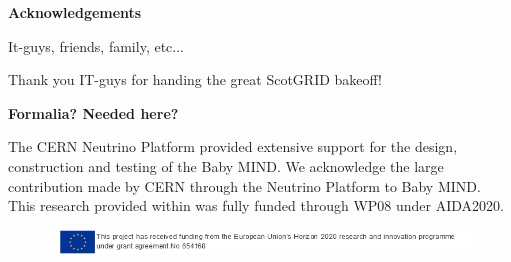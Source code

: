 \vspace*{1.75in}

\begin{center} {\bf Acknowledgements}\end{center}

It-guys, friends, family, etc...

Thank you IT-guys for handing the great ScotGRID bakeoff!

\textbf{Formalia? Needed here?}

The CERN Neutrino Platform provided extensive support for the design, construction and testing of the Baby MIND. We acknowledge the large contribution made by CERN through the Neutrino Platform to Baby MIND.
This research provided within was fully funded through WP08 under AIDA2020.
\begin{figure}[h!]
\centering
\includegraphics[width=\textwidth]{figures/AIDAACK.png}
\end{figure}

